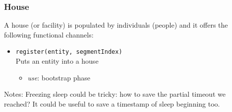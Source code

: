 \subsubsection{House}
A house (or facility) is populated by individuals (people) and it offers the following functional channels:
\begin{itemize}
	\item \texttt{register(entity, segmentIndex)}
	\\Puts an entity into a house
	\begin{itemize}
		\item \textit{use}: bootstrap phase
	\end{itemize}
\end{itemize}
Notes:
Freezing sleep could be tricky: how to save the partial timeout we reached? It could be useful to save a timestamp of sleep beginning too.